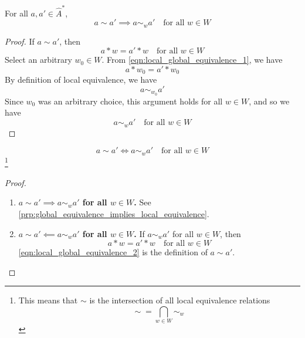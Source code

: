 \begin{proposition}\label{prp:global_equivalence_implies_local_equivalence}
    For all $a, a' \in \hat{A}^{*}$,
    \begin{equation}
        a \sim a' \implies a \sim_{w} a' \quad \text{for all $w \in W$}
    \end{equation}
\end{proposition}
\begin{proof}
    If $a \sim a'$, then
    \begin{equation}
        \label{eqn:local_global_equivalence_1}
        a \ast w = a' \ast w \quad \text{for all $w \in W$}
    \end{equation}
    Select an arbitrary $w_{0} \in W$.
    From \cref{eqn:local_global_equivalence_1}, we have
    \begin{equation}
        a \ast w_{0} = a' \ast w_{0}
    \end{equation}
    By definition of local equivalence, we have
    \begin{equation}
        a \sim_{w_{0}} a'
    \end{equation}
    Since $w_{0}$ was an arbitrary choice, this argument holds for all $w \in W$, and so we have
    \begin{equation}
        a \sim_{w} a' \quad \text{for all $w \in W$}
    \end{equation}
\end{proof}


\begin{proposition}
    \begin{equation}
        a \sim a' \iff a \sim_{w} a' \quad \text{for all $w \in W$}
    \end{equation}
    \footnote{
    This means that $\sim$ is the intersection of all local equivalence relations
    \begin{equation}
        \sim \; = \bigcap_{w \in W} \sim_{w}
    \end{equation}
    }
\end{proposition}
\begin{proof}
\begin{enumerate}[(1)]
    \item \textbf{$a \sim a' \implies a \sim_{w} a'$ for all $w \in W$.}
    See \cref{prp:global_equivalence_implies_local_equivalence}.

    \item \textbf{$a \sim a' \impliedby a \sim_{w} a'$ for all $w \in W$.}
    If $a \sim_{w} a'$ for all $w \in W$, then
    \begin{equation}
        \label{eqn:local_global_equivalence_2}
        a \ast w = a' \ast w \quad \text{for all $w \in W$}
    \end{equation}
    \cref{eqn:local_global_equivalence_2} is the definition of $a \sim a'$.
\end{enumerate}
\end{proof}

